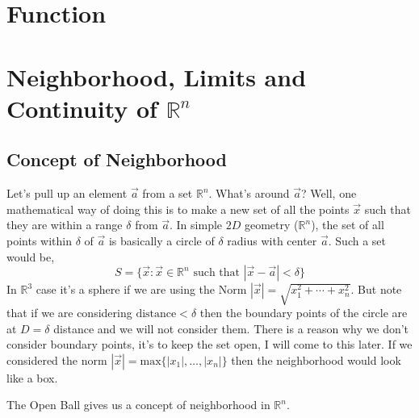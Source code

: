 \documentclass[letter]{article}
\begin{document}
\section*{Function}





\section*{Neighborhood, Limits and Continuity of $\mathbb{R}^{n}$ }

\subsection*{Concept of Neighborhood}
\textsf{Let's pull up an element $\vec{a}$ from a set $\mathbb{R}^{n}$. What's around $\vec{a}$? Well, one mathematical way of doing this is to make a new set of all the points $\vec{x}$ such that they are within a range $\delta$ from $\vec{a}$. In simple $2D$ geometry ($\mathbb{R}^{n}$), the set of all points within $\delta$ of $\vec{a}$ is basically a circle of $\delta$ radius with center $ \vec{a}$. Such a set would be, 
	\[
	S = \{\vec{x} : \vec{x} \in \mathbb{R}^{n} \text{ such that } |\vec{x} - \vec{a}| < \delta\} 
	\] 
	\newline
In $\mathbb{R}^{3}$ case it's a sphere if we are using the Norm $|\vec{x}| = \sqrt{x_1^2 + \cdots + x_n^2} $. But note that if we are considering $\text{distance} < \delta$ then the boundary points of the circle are at $D = \delta$ distance and we will not consider them. There is a reason why we don't consider boundary points, it's to keep the set open, I will come to this later. 
\newline
If we considered the norm $|\vec{x}| = \text{max} \{|x_1| , \ldots, |x_n|\} $ then the neighborhood would look like a box.} 

The Open Ball gives us a concept of neighborhood in $\mathbb{R}^{n}$. 
\end{document}
